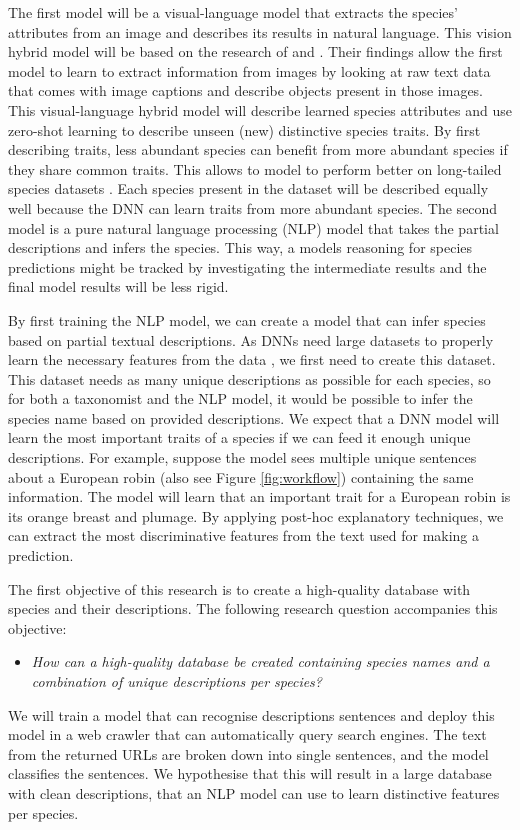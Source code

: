 \documentclass[a4paper, 12pt, oneside]{book} %
\begin{document}
The first model will be a visual-language model that extracts the species' attributes from an image and describes its results in natural language. 
This vision hybrid model will be based on the research  of \textcite{radford_learning_2021} and \textcite{huang_interpretable_2020}.
Their findings allow the first model to learn to extract information from images by looking at raw text data that comes with image captions and describe objects present in those images.
This visual-language hybrid model will describe learned species attributes and use zero-shot learning to describe unseen (new) distinctive species traits.
By first describing traits, less abundant species can benefit from more abundant species if they share common traits.
This allows to model to perform better on long-tailed species datasets \autocite{van_horn_inaturalist_2018}.
Each species present in the dataset will be described equally well because the DNN can learn traits from more abundant species.
The second model is a pure natural language processing (NLP) model that takes the partial descriptions and infers the species.
This way, a models reasoning for species predictions might be tracked by investigating the intermediate results \autocite{ishikawa_contextual_2021} and the final model results will be less rigid.

By first training the NLP model, we can create a model that can infer species based on partial textual descriptions. 
As DNNs need large datasets to properly learn the necessary features from the data \autocite{xue-wen_chen_big_2014, gheisari_survey_2017}, we first need to create this dataset.
This dataset needs as many unique descriptions as possible for each species, so for both a taxonomist and the NLP model, it would be possible to infer the species name based on provided descriptions.
We expect that a DNN model will learn the most important traits of a species if we can feed it enough unique descriptions.
For example, suppose the model sees multiple unique sentences about a European robin (also see Figure \ref{fig:workflow}) containing the same information.
The model will learn that an important trait for a European robin is its orange breast and plumage.
By applying post-hoc explanatory techniques, we can extract the most discriminative features from the text used for making a prediction.

The first objective of this research is to create a high-quality database with species and their descriptions.
The following research question accompanies this objective:
\begin{itemize}
    \item \emph{How can a high-quality database be created containing species names and a combination of unique descriptions per species?}
\end{itemize}
We will train a model that can recognise descriptions sentences and deploy this model in a web crawler that can automatically query search engines.
The text from the returned URLs are broken down into single sentences, and the model classifies the sentences.
We hypothesise that this will result in a large database with clean descriptions,
that an NLP model can use to learn distinctive features per species.
\end{document}
